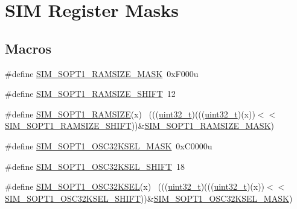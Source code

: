 \hypertarget{group___s_i_m___register___masks}{}\section{S\+IM Register Masks}
\label{group___s_i_m___register___masks}
\subsection*{Macros}
\begin{DoxyCompactItemize}
\item 
\#define \hyperlink{group___s_i_m___register___masks_ga9fbcfd0b3e4fb08ee733dee975a5df29}{S\+I\+M\+\_\+\+S\+O\+P\+T1\+\_\+\+R\+A\+M\+S\+I\+Z\+E\+\_\+\+M\+A\+SK}~0x\+F000u
\item 
\#define \hyperlink{group___s_i_m___register___masks_ga4100f9e8e8ffc766ac1ac6493379b8dc}{S\+I\+M\+\_\+\+S\+O\+P\+T1\+\_\+\+R\+A\+M\+S\+I\+Z\+E\+\_\+\+S\+H\+I\+FT}~12
\item 
\#define \hyperlink{group___s_i_m___register___masks_gaf9b9b3caaa8087f8530f5c2d1418e7b0}{S\+I\+M\+\_\+\+S\+O\+P\+T1\+\_\+\+R\+A\+M\+S\+I\+ZE}(x)                                      ~(((\hyperlink{_p_e___types_8h_a33594304e786b158f3fb30289278f5af}{uint32\+\_\+t})(((\hyperlink{_p_e___types_8h_a33594304e786b158f3fb30289278f5af}{uint32\+\_\+t})(x))$<$$<$\hyperlink{group___s_i_m___register___masks_ga4100f9e8e8ffc766ac1ac6493379b8dc}{S\+I\+M\+\_\+\+S\+O\+P\+T1\+\_\+\+R\+A\+M\+S\+I\+Z\+E\+\_\+\+S\+H\+I\+FT}))\&\hyperlink{group___s_i_m___register___masks_ga9fbcfd0b3e4fb08ee733dee975a5df29}{S\+I\+M\+\_\+\+S\+O\+P\+T1\+\_\+\+R\+A\+M\+S\+I\+Z\+E\+\_\+\+M\+A\+SK})
\item 
\#define \hyperlink{group___s_i_m___register___masks_ga5c660cd4a6d8062e6ef4afbc17c27fa4}{S\+I\+M\+\_\+\+S\+O\+P\+T1\+\_\+\+O\+S\+C32\+K\+S\+E\+L\+\_\+\+M\+A\+SK}~0x\+C0000u
\item 
\#define \hyperlink{group___s_i_m___register___masks_gac9e930c4ee375a2aee6fa6c97e061226}{S\+I\+M\+\_\+\+S\+O\+P\+T1\+\_\+\+O\+S\+C32\+K\+S\+E\+L\+\_\+\+S\+H\+I\+FT}~18
\item 
\#define \hyperlink{group___s_i_m___register___masks_ga7bede429b5cc2fda927f328ecd9ebd72}{S\+I\+M\+\_\+\+S\+O\+P\+T1\+\_\+\+O\+S\+C32\+K\+S\+EL}(x)                                  ~(((\hyperlink{_p_e___types_8h_a33594304e786b158f3fb30289278f5af}{uint32\+\_\+t})(((\hyperlink{_p_e___types_8h_a33594304e786b158f3fb30289278f5af}{uint32\+\_\+t})(x))$<$$<$\hyperlink{group___s_i_m___register___masks_gac9e930c4ee375a2aee6fa6c97e061226}{S\+I\+M\+\_\+\+S\+O\+P\+T1\+\_\+\+O\+S\+C32\+K\+S\+E\+L\+\_\+\+S\+H\+I\+FT}))\&\hyperlink{group___s_i_m___register___masks_ga5c660cd4a6d8062e6ef4afbc17c27fa4}{S\+I\+M\+\_\+\+S\+O\+P\+T1\+\_\+\+O\+S\+C32\+K\+S\+E\+L\+\_\+\+M\+A\+SK})

\end{DoxyCompactItemize}

